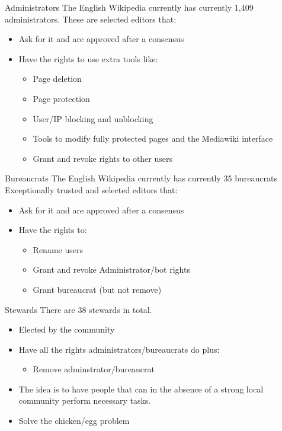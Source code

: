 \documentclass{beamer}
\begin{document}
\begin{frame}{Administrators}
	The English Wikipedia currently has currently 1,409 administrators. These are selected editors that:
	\begin{itemize}
		\pause \item Ask for it and are approved after a consensus
		\pause \item Have the rights to use extra tools like:
			\begin{itemize}
				\pause \item Page deletion
				\pause \item Page protection
				\pause \item User/IP blocking and unblocking
				\pause \item Tools to modify fully protected pages and the Mediawiki interface
				\pause \item Grant and revoke rights to other users
			\end{itemize}
	\end{itemize}
\end{frame}
\begin{frame}{Bureaucrats}
	The English Wikipedia currently has currently 35 bureaucrats
	Exceptionally trusted and selected editors that:
	\begin{itemize}
		\pause \item Ask for it and are approved after a consensus
		\pause \item Have the rights to:
			\begin{itemize}
				\pause \item Rename users
				\pause \item Grant and revoke Administrator/bot rights
				\pause \item Grant bureaucrat (but not remove)
			\end{itemize}
	\end{itemize}
\end{frame}
\begin{frame}{Stewards}
	There are 38 stewards in total.
	\begin{itemize}
		\pause \item Elected by the community
		\pause \item Have all the rights administrators/bureaucrats do plus:
			\begin{itemize}
				\pause \item Remove adminstrator/bureaucrat
			\end{itemize}
		\pause \item The idea is to have people that can in the absence of a strong local community perform necessary tasks.
		\pause \item Solve the chicken/egg problem
	\end{itemize}
\end{frame}
\end{document}
